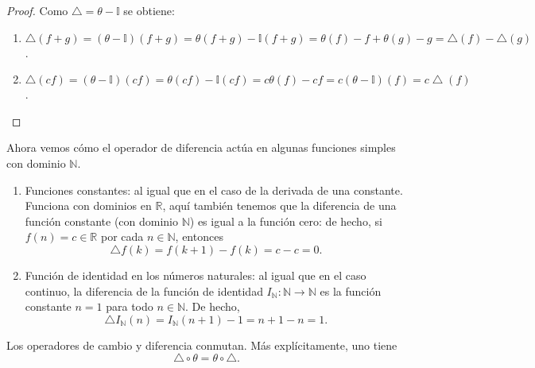 \begin{proof}
	Como $ \bigtriangleup=\theta-\mathds{I}$ se obtiene:
	\begin{enumerate}
		\item $\bigtriangleup\left(f+g\right)=\left(\theta-\mathds{I}\right)\left(f+g\right)=\theta\left(f+g\right)-\mathds{I}\left(f+g\right)=\theta(f)-f+\theta(g)-g=\bigtriangleup(f)-\bigtriangleup(g)$.
		\item $\bigtriangleup\left(cf\right)=\left(\theta-\mathds{I}\right)\left(cf\right)=\theta\left(cf\right)-\mathds{I}\left(cf\right)=c\theta(f)-cf=c(\theta-\mathds{I})(f)=c\bigtriangleup(f)$.
	\end{enumerate}
\end{proof}
Ahora vemos cómo el operador de diferencia actúa en algunas funciones simples con dominio $\mathds{N}$.

\eject

\begin{example}\leavevmode
	\begin{enumerate}
		\item Funciones constantes: al igual que en el caso de la derivada de una  constante. Funciona con dominios en $\mathds{R}$, aquí también tenemos que la diferencia de una función constante (con dominio $\mathds{N}$) es igual a la función cero: de hecho, si $f(n)=c\in\mathds{R}$ por cada $n\in\mathds{N}$, entonces \[ \bigtriangleup f(k)=f(k+1)-f(k)=c-c=0. \]
		\item Función de identidad en los números naturales: al igual que en el caso continuo, la diferencia de la función de identidad $I_{\mathds{N}}\colon\mathds{N}\rightarrow \mathds{N}$ es la función constante $n=1$ para todo $n\in\mathds{N}$. De hecho, \[ \bigtriangleup I_{\mathds{N}}(n)=I_{\mathds{N}}(n+1)-1=n+1-n=1. \]
		\end{enumerate}
\end{example}

\begin{example}
	Los operadores de cambio y diferencia conmutan. Más explícitamente, uno tiene \[ \bigtriangleup\circ\theta=\theta\circ\bigtriangleup. \]
\end{example}

